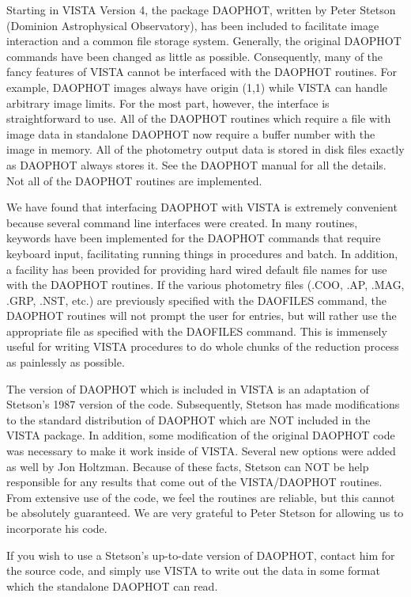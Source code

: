 Starting in VISTA Version 4, the package DAOPHOT, written by Peter Stetson
(Dominion Astrophysical Observatory), has been included to facilitate image
interaction and a common file storage system. Generally, the original
DAOPHOT commands have been changed as little as possible. Consequently,
many of the fancy features of VISTA cannot be interfaced with the DAOPHOT
routines.  For example, DAOPHOT images always have origin (1,1) while VISTA
can handle arbitrary image limits. For the most part, however, the
interface is straightforward to use. All of the DAOPHOT routines which
require a file with image data in standalone DAOPHOT now require a buffer
number with the image in memory. All of the photometry output data is
stored in disk files exactly as DAOPHOT always stores it. See the DAOPHOT
manual for all the details. Not all of the DAOPHOT routines are
implemented.

We have found that interfacing DAOPHOT with VISTA is extremely convenient
because several command line interfaces were created. In many routines,
keywords have been implemented for the DAOPHOT commands that require
keyboard input, facilitating running things in procedures and batch. In
addition, a facility has been provided for providing hard wired default
file names for use with the DAOPHOT routines. If the various photometry
files (.COO, .AP, .MAG, .GRP, .NST, etc.) are previously specified with the
DAOFILES command, the DAOPHOT routines will not prompt the user for
entries, but will rather use the appropriate file as specified with the
DAOFILES command. This is immensely useful for writing VISTA procedures to
do whole chunks of the reduction process as painlessly as possible.

The version of DAOPHOT which is included in VISTA is an adaptation of
Stetson's 1987 version of the code. Subsequently, Stetson has made
modifications to the standard distribution of DAOPHOT which are NOT
included in the VISTA package. In addition, some modification of the
original DAOPHOT code was necessary to make it work inside of VISTA.
Several new options were added as well by Jon Holtzman. Because of these
facts, Stetson can NOT be help responsible for any results that come out of
the VISTA/DAOPHOT routines. From extensive use of the code, we feel the
routines are reliable, but this cannot be absolutely guaranteed. We are
very grateful to Peter Stetson for allowing us to incorporate his code.

If you wish to use a Stetson's up-to-date version of DAOPHOT, contact him
for the source code, and simply use VISTA to write out the data in some
format which the standalone DAOPHOT can read.

